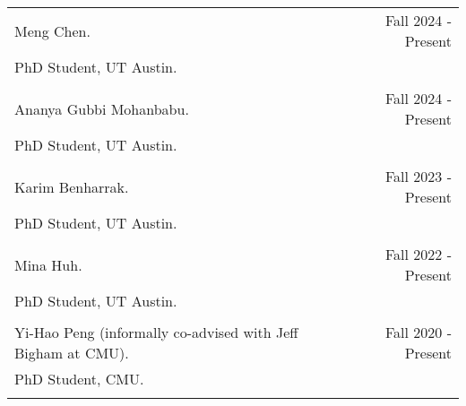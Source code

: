 \begin{longtable}{Xr}
	Meng Chen. & Fall 2024 - Present \\
	PhD Student, UT Austin. &  \\
	\\

	Ananya Gubbi Mohanbabu. & Fall 2024 - Present \\
	PhD Student, UT Austin. &  \\
	\\

	Karim Benharrak. & Fall 2023 - Present \\
	PhD Student, UT Austin. &  \\
	\\

	Mina Huh. & Fall 2022 - Present \\
	PhD Student, UT Austin. &  \\
	\\

	Yi-Hao Peng (informally co-advised with Jeff Bigham at CMU). & Fall 2020 - Present \\
	PhD Student, CMU. &  \\
	\\

\end{longtable}